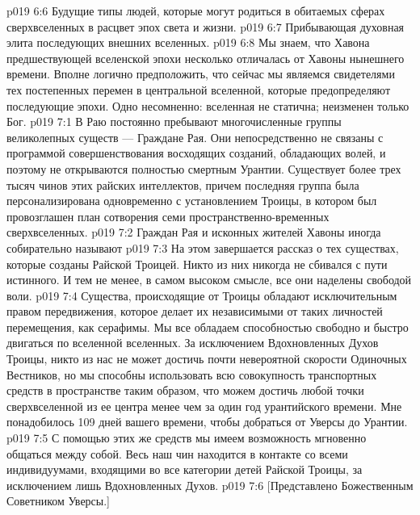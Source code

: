 \vs p019 6:6 \bibnobreakspace Будущие типы людей, которые могут родиться в обитаемых сферах сверхвселенных в расцвет эпох света и жизни.
\vs p019 6:7 \bibnobreakspace Прибывающая духовная элита последующих внешних вселенных.
\vs p019 6:8 Мы знаем, что Хавона предшествующей вселенской эпохи несколько отличалась от Хавоны нынешнего времени. Вполне логично предположить, что сейчас мы являемся свидетелями тех постепенных перемен в центральной вселенной, которые предопределяют последующие эпохи. Одно несомненно: вселенная не статична; неизменен только Бог.
\vs p019 7:1 В Раю постоянно пребывают многочисленные группы великолепных существ --- Граждане Рая. Они непосредственно не связаны с программой совершенствования восходящих созданий, обладающих волей, и поэтому не открываются полностью смертным Урантии. Существует более трех тысяч чинов этих райских интеллектов, причем последняя группа была персонализирована одновременно с установлением Троицы, в котором был провозглашен план сотворения семи пространственно\hyp{}временных сверхвселенных.
\vs p019 7:2 \pc Граждан Рая и исконных жителей Хавоны иногда собирательно называют 
\vs p019 7:3 \pc На этом завершается рассказ о тех существах, которые созданы Райской Троицей. Никто из них никогда не сбивался с пути истинного. И тем не менее, в самом высоком смысле, все они наделены свободой воли.
\vs p019 7:4 Существа, происходящие от Троицы обладают исключительным правом передвижения, которое делает их независимыми от таких личностей перемещения, как серафимы. Мы все обладаем способностью свободно и быстро двигаться по вселенной вселенных. За исключением Вдохновленных Духов Троицы, никто из нас не может достичь почти невероятной скорости Одиночных Вестников, но мы способны использовать всю совокупность транспортных средств в пространстве таким образом, что можем достичь любой точки сверхвселенной из ее центра менее чем за один год урантийского времени. Мне понадобилось 109 дней вашего времени, чтобы добраться от Уверсы до Урантии.
\vs p019 7:5 С помощью этих же средств мы имеем возможность мгновенно общаться между собой. Весь наш чин находится в контакте со всеми индивидуумами, входящими во все категории детей Райской Троицы, за исключением лишь Вдохновленных Духов.
\vsetoff
\vs p019 7:6 [Представлено Божественным Советником Уверсы.]
